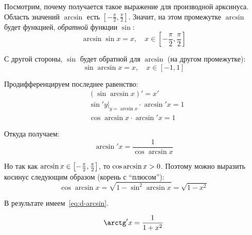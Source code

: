 \documentclass[a4paper,12pt]{article}
\begin{document}
  \begin{example}
    Посмотрим, почему получается такое выражение для производной арксинуса.
    Область значений $\arcsin$ есть $\left[{-}\frac{\pi}{2}, \frac{\pi}{2}\right]$.
    Значит, на этом промежутке $\arcsin$ будет функцией, \emph{обратной} функции $\sin$:
    \[
      \arcsin \sin x = x,\quad x \in \left[{-}\frac{\pi}{2}, \frac{\pi}{2}\right]
    \]
    
    С другой стороны, $\sin$ будет обратной для $\arcsin$ (на другом промежутке):
    \[
      \sin \arcsin x = x,\quad x \in [-1, 1]
    \]
    
    Продифференцируем последнее равенство:
    \[
      \begin{aligned}
        &(\sin \arcsin x)' = x'\\
        &\sin' y|_{y = \arcsin x} \cdot \arcsin' x = 1\\
        &\cos \arcsin x \cdot \arcsin' x = 1
      \end{aligned}
    \]
    
    Откуда получаем:
    \[
      \arcsin' x = \frac{1}{\cos \arcsin x}
    \]
    
    Но так как $\arcsin x \hm\in \left[{-}\frac{\pi}{2}, \frac{\pi}{2}\right]$, то $\cos \arcsin x \hm> 0$.
    Поэтому можно выразить косинус следующим образом (корень с ``плюсом''):
    \[
      \cos \arcsin x = \sqrt{1 - \sin^2 \arcsin x} = \sqrt{1 - x^2}
    \]
    
    В результате имеем~\eqref{eq:d-arcsin}.
  \end{example}
  
  \begin{equation}
    \arctg' x = \frac{1}{1 + x^2}
  \end{equation}
  
\end{document}
